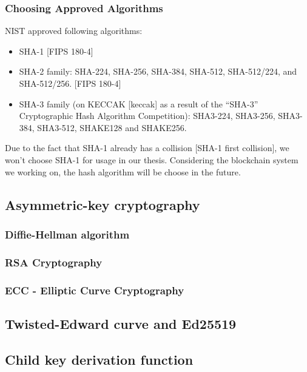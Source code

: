 \subsubsection{Choosing Approved Algorithms}
NIST approved following algorithms: 
\begin{itemize}	
	\item SHA-1 [FIPS 180-4]

	\item SHA-2 family: SHA-224, SHA-256, SHA-384, SHA-512, SHA-512/224, and SHA-512/256. [FIPS 180-4]
	
	\item SHA-3 family (on KECCAK [keccak] as a result of the “SHA-3” Cryptographic Hash Algorithm Competition):  SHA3-224, SHA3-256, SHA3-384, SHA3-512, SHAKE128 and SHAKE256. 
\end{itemize}
Due to the fact that SHA-1 already has a collision [SHA-1 first collision], we won't choose SHA-1 for usage in our thesis. 
Considering the blockchain system we working on, the hash algorithm will be choose in the future.

\subsection{Asymmetric-key cryptography}
\label{sec:asymmetric_cryptography}

\subsubsection{Diffie-Hellman algorithm}

\subsubsection{RSA Cryptography}

\subsubsection{ECC - Elliptic Curve Cryptography}

\subsection{Twisted-Edward curve and Ed25519}

\subsection{Child key derivation function}
